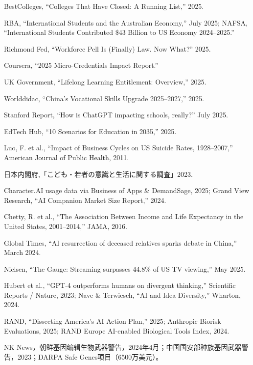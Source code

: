 \documentclass[11pt,a4paper]{ctexart}
\begin{document}
\noindent [95] BestColleges, ``Colleges That Have Closed: A Running List,'' 2025.

\noindent [96] RBA, ``International Students and the Australian Economy,'' July 2025; NAFSA, ``International Students Contributed \$43 Billion to US Economy 2024--2025.''

\noindent [97] Richmond Fed, ``Workforce Pell Is (Finally) Law. Now What?'' 2025.

\noindent [98] Coursera, ``2025 Micro-Credentials Impact Report.''

\noindent [99] UK Government, ``Lifelong Learning Entitlement: Overview,'' 2025.

\noindent [100] Worlddidac, ``China's Vocational Skills Upgrade 2025--2027,'' 2025.

\noindent [101] Stanford Report, ``How is ChatGPT impacting schools, really?'' July 2025.

\noindent [102] EdTech Hub, ``10 Scenarios for Education in 2035,'' 2025.

\noindent [103] Luo, F. et al., ``Impact of Business Cycles on US Suicide Rates, 1928--2007,'' American Journal of Public Health, 2011.

\noindent [104] 日本内閣府,「こども{\jpfont ・}若者の意識と生活に関する調査」2023.

\noindent [105] Character.AI usage data via Business of Apps \& DemandSage, 2025; Grand View Research, ``AI Companion Market Size Report,'' 2024.

\noindent [106] Chetty, R. et al., ``The Association Between Income and Life Expectancy in the United States, 2001--2014,'' JAMA, 2016.

\noindent [107] Global Times, ``AI resurrection of deceased relatives sparks debate in China,'' March 2024.

\noindent [108] Nielsen, ``The Gauge: Streaming surpasses 44.8\% of US TV viewing,'' May 2025.

\noindent [109] Hubert et al., ``GPT-4 outperforms humans on divergent thinking,'' Scientific Reports / Nature, 2023; Nave \& Terwiesch, ``AI and Idea Diversity,'' Wharton, 2024.

\noindent [110] RAND, ``Dissecting America's AI Action Plan,'' 2025; Anthropic Biorisk Evaluations, 2025; RAND Europe AI-enabled Biological Tools Index, 2024.

\noindent [111] NK News，朝鲜基因编辑生物武器警告，2024年4月；中国国安部种族基因武器警告，2023；DARPA Safe Genes项目（6500万美元）。
\end{document}
